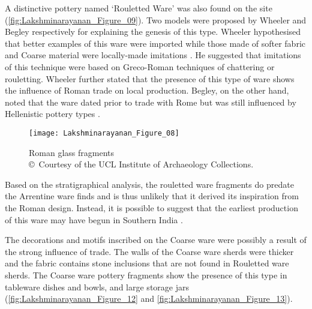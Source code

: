 A distinctive pottery named ‘Rouletted Ware’ was also found on the site (\cref{fig:Lakshminarayanan_Figure_09}). Two models were proposed by Wheeler and Begley respectively for explaining the genesis of this type. Wheeler hypothesised that better examples of this ware were imported while those made of softer fabric and Coarse material were locally-made imitations \parencite[][149]{wheeler1954}. He suggested that imitations of this technique were based on Greco-Roman techniques of chattering or rouletting. Wheeler further stated that the presence of this type of ware shows the influence of Roman trade on local production. Begley, on the other hand, noted that the ware dated prior to trade with Rome but was still influenced by Hellenistic pottery types \parencite[][427]{begley1988}.

\begin{wrapfigure}{O}[3cm]{0.5\textwidth} 
	\texttt{[image: Lakshminarayanan\_Figure\_08]}
	\caption{Roman glass fragments\\
		{\normalfont\scriptsize\copyright\ Courtesy of the UCL Institute of Archaeology Collections.
	}}
	\label{fig:Lakshminarayanan_Figure_08}
\end{wrapfigure}
Based on the stratigraphical analysis, the rouletted ware fragments do predate the Arrentine ware finds and is thus unlikely that it derived its inspiration from the Roman design. Instead, it is possible to suggest that the earliest production of this ware may have begun in Southern India \parencite[][54]{begley1986}.


The decorations and motifs inscribed on the Coarse ware were possibly a result of the strong influence of trade. The walls of the Coarse ware sherds were thicker and the fabric contains stone inclusions that are not found in Rouletted ware sherds. The Coarse ware pottery fragments show the presence of this type in tableware dishes and bowls, and large storage jars (\cref{fig:Lakshminarayanan_Figure_12} and \cref{fig:Lakshminarayanan_Figure_13}).

